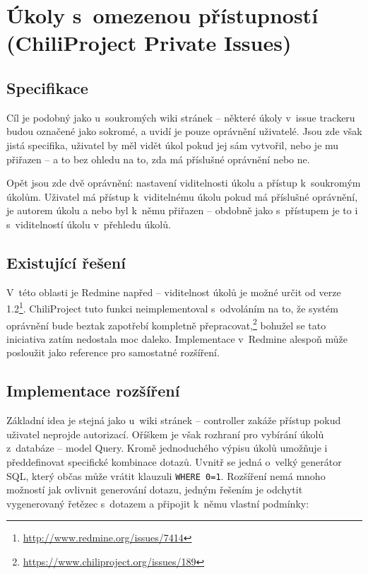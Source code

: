 \documentclass[thesis=B,czech]{FITthesis}[2012/05/02]
\begin{document}
\section[Úkoly s~omezenou přístupností]{Úkoly s~omezenou přístupností (ChiliProject Private Issues)}
\label{sec:private_issues}

\subsection{Specifikace}

Cíl je podobný jako u~soukromých wiki stránek -- některé úkoly v~issue
trackeru budou označené jako sokromé, a uvidí je pouze oprávnění
uživatelé. Jsou zde však jistá specifika, uživatel by měl vidět úkol
pokud jej sám vytvořil, nebo je mu přiřazen -- a to bez ohledu na to,
zda má příslušné oprávnění nebo ne.

Opět jsou zde dvě oprávnění: nastavení viditelnosti úkolu a přístup
k~soukromým úkolům. Uživatel má přístup k~viditelnému úkolu pokud má
příslušné oprávnění, je autorem úkolu a nebo byl k~němu přiřazen --
obdobně jako s~přístupem je to i s~viditelností úkolu v~přehledu úkolů.

\subsection{Existující řešení}

V~této oblasti je Redmine napřed -- viditelnost úkolů je možné určit od
verze 1.2\footnote{\url{http://www.redmine.org/issues/7414}}.
ChiliProject tuto funkci neimplementoval s~odvoláním na to, že systém
oprávnění bude beztak zapotřebí kompletně přepracovat,\footnote{\url{https://www.chiliproject.org/issues/189}}
bohužel se tato iniciativa zatím nedostala moc daleko. Implementace
v~Redmine alespoň může posloužit jako reference pro samostatné
rozšíření.

\subsection{Implementace rozšíření}

Základní idea je stejná jako u~wiki stránek -- controller zakáže přístup
pokud uživatel neprojde autorizací. Oříškem je však rozhraní pro
vybírání úkolů z~databáze -- model Query. Kromě jednoduchého výpisu
úkolů umožňuje i předdefinovat specifické kombinace dotazů. Uvnitř se
jedná o~velký generátor SQL, který občas může vrátit klauzuli
\lstinline!WHERE 0=1!. Rozšíření nemá mnoho možností jak ovlivnit
generování dotazu, jedným řešením je odchytit vygenerovaný řetězec
s~dotazem a připojit k~němu vlastní podmínky:
\end{document}
